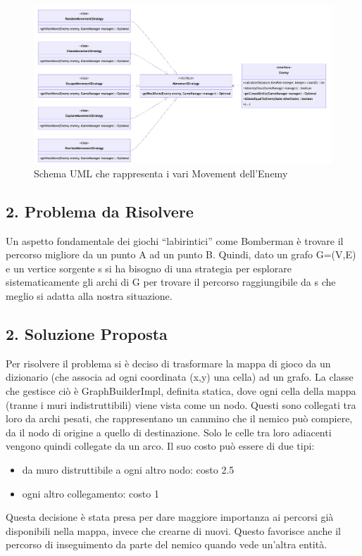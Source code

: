 \documentclass[a4paper,12pt]{report}
\begin{document}
\begin{figure}[h]
\centering{}
\includegraphics[width=\textwidth]{img/enemyMovement.png}
\caption{Schema UML che rappresenta i vari Movement dell'Enemy}
\end{figure}

\subsection*{2. Problema da Risolvere}
\par
Un aspetto fondamentale dei giochi “labirintici” come Bomberman è trovare il percorso migliore da un punto A ad un punto B. Quindi, dato un grafo G=(V,E) e un vertice sorgente s si ha bisogno di una strategia per esplorare sistematicamente gli archi di G per trovare il percorso raggiungibile da s che meglio si adatta alla nostra situazione. 

\subsection*{2. Soluzione Proposta}
\par
Per risolvere il problema si è deciso di trasformare la mappa di gioco da un dizionario (che associa ad ogni coordinata (x,y) una cella) ad un grafo.
La classe che gestisce ciò è GraphBuilderImpl, definita statica, dove ogni cella della mappa (tranne i muri indistruttibili) viene vista come un nodo. Questi sono collegati tra loro da archi pesati, che rappresentano un cammino che il nemico può compiere, da il nodo di origine a quello di destinazione. Solo le celle tra loro adiacenti vengono quindi collegate da un arco. Il suo costo può essere di due tipi:
\begin{itemize}
    \item da muro distruttibile a ogni altro nodo: costo 2.5
    \item ogni altro collegamento: costo 1
\end{itemize}
Questa decisione è stata presa per dare maggiore importanza ai percorsi già disponibili nella mappa, invece che crearne di nuovi. Questo favorisce anche il percorso di inseguimento da parte del nemico quando vede un'altra entità.
\end{document}
